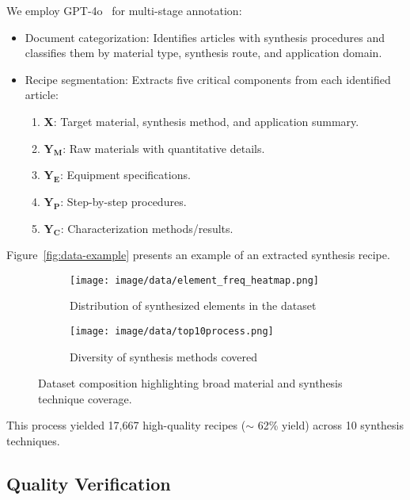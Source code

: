 We employ GPT-4o~\cite{achiam2023gpt} for multi-stage annotation:
\begin{itemize}
    \item Document categorization: Identifies articles with synthesis procedures and classifies them by material type, synthesis route, and application domain.
    \item Recipe segmentation: Extracts five critical components from each identified article:
    \begin{enumerate}
        \item \textbf{X}: Target material, synthesis method, and application summary.
        \item \(\mathbf{Y_M}\): Raw materials with quantitative details.
        \item \(\mathbf{Y_E}\): Equipment specifications.
        \item \(\mathbf{Y_P}\): Step-by-step procedures.
        \item \(\mathbf{Y_C}\): Characterization methods/results.
    \end{enumerate}
\end{itemize}

Figure~\ref{fig:data-example} presents an example of an extracted synthesis recipe.

\begin{figure*}[!ht]
    \begin{subfigure}{.55\textwidth}
        \centering
        \texttt{[image: image/data/element\_freq\_heatmap.png]}
        \caption{Distribution of synthesized elements in the dataset}
        \label{fig:data-element-distribution}
    \end{subfigure}
    \begin{subfigure}{.43\textwidth}
        \centering
        \texttt{[image: image/data/top10process.png]}
        \caption{Diversity of synthesis methods covered}
        \label{fig:data-process-distribution}
    \end{subfigure}
    \caption{Dataset composition highlighting broad material and synthesis technique coverage.}
    \label{fig:main-data-distribution}
\end{figure*}

This process yielded 17,667 high-quality recipes (\(\sim\) 62\% yield) across 10 synthesis techniques.

\subsection{Quality Verification}
\label{subsec:quality_verification}

